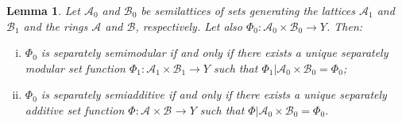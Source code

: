 \documentclass[11pt]{amsart}
\theoremstyle{plain}
\newtheorem{lemma}{Lemma}
\begin{document}
\begin{lemma}
\label{lemma fubini}
Let ${\mathscr{A}}_0$ and $\mathscr B_0$ be semilattices of sets generating the lattices 
${\mathscr{A}}_1$ and $\mathscr B_1$ and the rings ${\mathscr{A}}$ and $\mathscr B$, respectively. 
Let also $\Phi_0:{{\mathscr{A}}_{{0}}\times\mathscr B_{{0}}}\to Y$. Then:
\begin{enumerate}[(i)]
\item $\Phi_0$ is separately semimodular if and only if there exists a unique separately 
modular set function $\Phi_1:{{\mathscr{A}}_{{1}}\times\mathscr B_{{1}}}\to Y$ such that ${{\Phi_1}\vert {{{\mathscr{A}}_{{0}}\times\mathscr B_{{0}}}}}=\Phi_0$;
\item $\Phi_0$ is separately semiadditive if and only if there exists a unique separately 
additive set function $\Phi:{{\mathscr{A}}_{{}}\times\mathscr B_{{}}}\to Y$ such that ${{\Phi}\vert {{{\mathscr{A}}_{{0}}\times\mathscr B_{{0}}}}}=\Phi_0$.
\end{enumerate}
\end{lemma}
\end{document}
